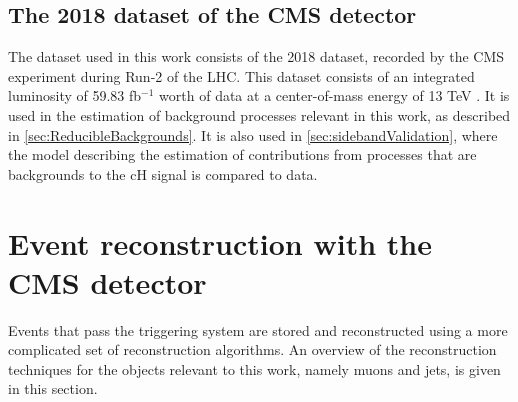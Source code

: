 \subsection{The 2018 dataset of the CMS detector}
The dataset used in this work consists of the 2018 dataset, recorded by the CMS experiment during Run-2 of the LHC. This dataset consists of an integrated luminosity of 59.83 fb$^{-1}$ worth of data at a center-of-mass energy of 13 TeV \cite{CMSLumi}. It is used in the estimation of background processes relevant in this work, as described in \autoref{sec:ReducibleBackgrounds}. It is also used in \autoref{sec:sidebandValidation}, where the model describing the estimation of contributions from processes that are backgrounds to the cH signal is compared to data. 

\section{Event reconstruction with the CMS detector}
\label{sec:Reconstruction}
Events that pass the triggering system are stored and reconstructed using a more complicated set of reconstruction algorithms. An overview of the reconstruction techniques for the objects relevant to this work, namely muons and jets, is given in this section. 

